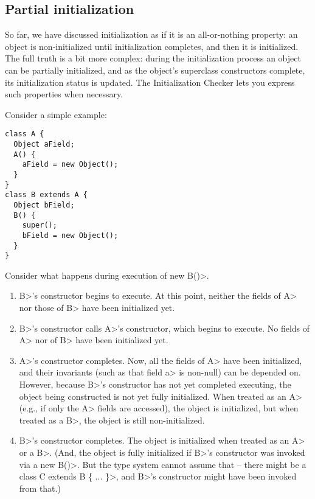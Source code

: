 \subsection{Partial initialization\label{partial-initialization}}

So far, we have discussed initialization as if it is an all-or-nothing property:
an object is non-initialized until initialization completes, and then it is initialized.  The full truth is a bit more complex:  during the
initialization process an object can be partially initialized, and as the
object's superclass constructors complete, its initialization status is updated.  The
Initialization Checker lets you express such properties when necessary.

Consider a simple example:

\begin{Verbatim}
class A {
  Object aField;
  A() {
    aField = new Object();
  }
}
class B extends A {
  Object bField;
  B() {
    super();
    bField = new Object();
  }
}
\end{Verbatim}

Consider what happens during execution of \<new B()>.

\begin{enumerate}
\item \<B>'s constructor begins to execute.  At this point, neither the
  fields of \<A> nor those of \<B> have been initialized yet.
\item \<B>'s constructor calls \<A>'s constructor, which begins to execute.
  No fields of \<A> nor of \<B> have been initialized yet.
\item \<A>'s constructor completes.  Now, all the fields of \<A> have been
  initialized, and their invariants (such as that field \<a> is non-null) can be
  depended on.  However, because \<B>'s constructor has not yet completed
  executing, the object being constructed is not yet fully initialized.
  When treated as an \<A> (e.g., if only the \<A> fields are accessed), the
  object is initialized, but when treated as a \<B>, the object
  is still non-initialized.
\item \<B>'s constructor completes.  The object is initialized when treated
  as an \<A> or a \<B>.  (And, the object is fully initialized
   if \<B>'s constructor was invoked via a \<new B()>.  But the type system
   cannot assume that -- there might be a \<class C extends B \{
  ... \}>, and \<B>'s constructor might have been invoked from that.)
\end{enumerate}

